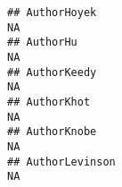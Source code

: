 \documentclass[]{article}
\begin{document}
\begin{verbatim}
## AuthorHoyek                                                                                                                                                                                                                                                                                                                                                                                                                                                                           NA
## AuthorHu                                                                                                                                                                                                                                                                                                                                                                                                                                                                              NA
## AuthorKeedy                                                                                                                                                                                                                                                                                                                                                                                                                                                                           NA
## AuthorKhot                                                                                                                                                                                                                                                                                                                                                                                                                                                                            NA
## AuthorKnobe                                                                                                                                                                                                                                                                                                                                                                                                                                                                           NA
## AuthorLevinson                                                                                                                                                                                                                                                                                                                                                                                                                                                                        NA

\end{verbatim}
\end{document}
